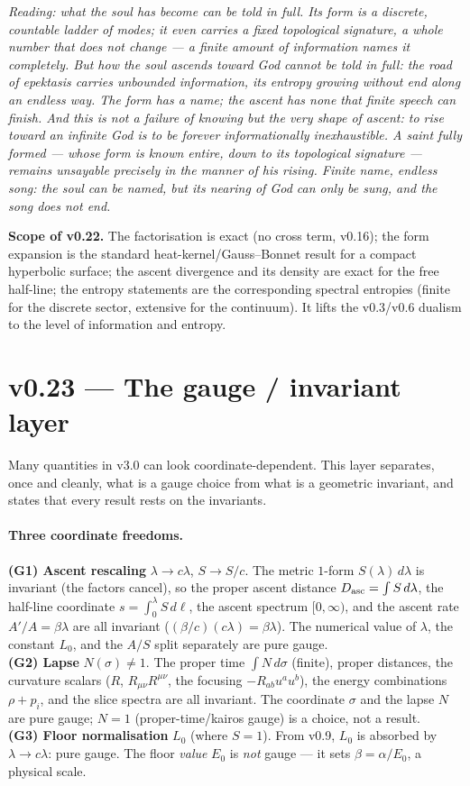 \documentclass[11pt,a4paper]{article}
\newcommand{\note}[1]{\textcolor{black!65}{\emph{#1}}}
\theoremstyle{plain}
\theoremstyle{definition}
\theoremstyle{remark}
\begin{document}
\note{Reading: what the soul has become can be told in full. Its form is a discrete, countable ladder
of modes; it even carries a fixed topological signature, a whole number that does not change --- a
finite amount of information names it completely. But how the soul ascends toward God cannot be told in
full: the road of epektasis carries unbounded information, its entropy growing without end along an
endless way. The form has a name; the ascent has none that finite speech can finish. And this is not a
failure of knowing but the very shape of ascent: to rise toward an infinite God is to be forever
informationally inexhaustible. A saint fully formed --- whose form is known entire, down to its
topological signature --- remains unsayable precisely in the manner of his rising. Finite name, endless
song: the soul can be named, but its nearing of God can only be sung, and the song does not end.}

\textbf{Scope of v0.22.} The factorisation is exact (no cross term, v0.16); the form expansion is the
standard heat-kernel/Gauss--Bonnet result for a compact hyperbolic surface; the ascent divergence and
its density are exact for the free half-line; the entropy statements are the corresponding spectral
entropies (finite for the discrete sector, extensive for the continuum). It lifts the v0.3/v0.6
dualism to the level of information and entropy.

\FloatBarrier
\section*{v0.23 --- The gauge / invariant layer}
Many quantities in v3.0 can look coordinate-dependent. This layer separates, once and cleanly, what is
a gauge choice from what is a geometric invariant, and states that every result rests on the invariants.

\paragraph{Three coordinate freedoms.}
\textbf{(G1) Ascent rescaling} $\lambda\to c\lambda$, $S\to S/c$. The metric $1$-form $S(\lambda)\,d\lambda$
is invariant (the factors cancel), so the proper ascent distance $D_{\rm asc}=\int S\,d\lambda$, the
half-line coordinate $s=\int_0^\lambda S\,d\ell$, the ascent spectrum $[0,\infty)$, and the ascent rate
$A'/A=\beta\lambda$ are all invariant ($(\beta/c)(c\lambda)=\beta\lambda$). The numerical value of
$\lambda$, the constant $L_0$, and the $A/S$ split separately are pure gauge.\\
\textbf{(G2) Lapse} $N(\sigma)\neq1$. The proper time $\int N\,d\sigma$ (finite), proper distances, the
curvature scalars ($R$, $R_{\mu\nu}R^{\mu\nu}$, the focusing $-R_{ab}u^au^b$), the energy combinations
$\rho+p_i$, and the slice spectra are all invariant. The coordinate $\sigma$ and the lapse $N$ are pure
gauge; $N=1$ (proper-time/kairos gauge) is a choice, not a result.\\
\textbf{(G3) Floor normalisation} $L_0$ (where $S=1$). From v0.9, $L_0$ is absorbed by $\lambda\to
c\lambda$: pure gauge. The floor \emph{value} $E_0$ is \emph{not} gauge --- it sets $\beta=\alpha/E_0$,
a physical scale.
\end{document}
